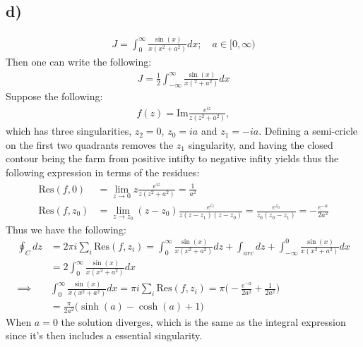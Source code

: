 \documentclass{article}
\newcommand{\res}[2]{\text{Res}(#1, #2)}
\begin{document}
\subsection*{d)}
\begin{align*}
    J = \int_0^\infty\frac{\sin(x)}{x(x^2+a^2)}dx; \quad a\in[0,\infty)
\end{align*}
Then one can write the following:
\begin{align*}
    J = \frac{1}{2}\int_{-\infty}^\infty \frac{\sin(x)}{x(^2 + a^2)}dx
\end{align*}
Suppose the following:
\begin{align*}
    f(z) = \text{Im}\frac{e^{iz}}{z(z^2 + a^2)},
\end{align*}which has three singularities, $z_2 = 0$, $z_0 = ia$ and $z_1 = -ia$. Defining a semi-cricle on the first two quadrants removes the $z_1$ singularity, and having the closed contour being the farm from positive intifty 
to negative infity yields thus the following expression in terms of the residues:
\begin{align*}
    \res{f}{0} &= \lim_{z\to0} z \frac{e^{iz}}{z(z^2 + a^2)} = \frac{1}{a^2}\\
    \res{f}{z_0} &= \lim_{z\to z_0} (z - z_0)\frac{e^{iz}}{z(z - z_1)(z - z_0)} = \frac{e^{z_0}}{z_0(z_0 - z_1)} = -\frac{e^{-a}}{2a^2}
\end{align*}
Thus we have the following:
\begin{align*}
    \oint_C dz &= 2\pi i\sum_{i}\res{f}{z_i} = \int_0^{\infty}\frac{\sin(x)}{x(x^2 + a^2)}dz + \int_{arc}dz + \int_{-\infty}^0\frac{\sin(x)}{x(x^2 +a^2)}dx\\
    &= 2\int_0^\infty \frac{\sin(x)}{x(x^2 + a^2)}dx\\
    \implies &\int_0^\infty\frac{\sin(x)}{x(x^2+a^2)}dx = \pi i\sum_i \res{f}{z_i} = \pi\Big(-\frac{e^{-a}}{2a^2} + \frac{1}{2a^2}\Big)\\
    &=\frac{\pi}{2a^2}\Big(\sinh(a) - \cosh(a) + 1\Big)
\end{align*}
When $a = 0$ the solution diverges, which is the same as the integral expression since it's then includes a essential singularity.
\end{document}
